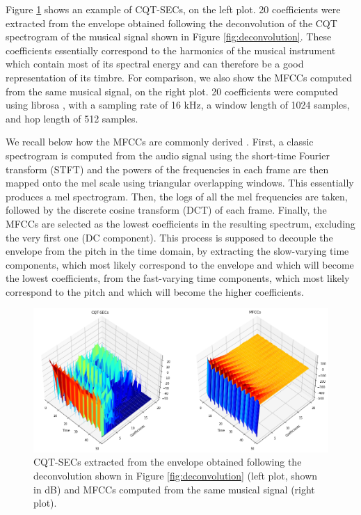 \documentclass[journal]{IEEEtran}
\begin{document}
Figure \ref{fig:extraction} shows an example of CQT-SECs, on the left plot. 20 coefficients were extracted from the envelope obtained following the deconvolution of the CQT spectrogram of the musical signal shown in Figure \ref{fig:deconvolution}. These coefficients essentially correspond to the harmonics of the musical instrument which contain most of its spectral energy and can therefore be a good representation of its timbre. For comparison, we also show the MFCCs computed from the same musical signal, on the right plot. 20 coefficients were computed using librosa \cite{mcfee2015}, with a sampling rate of 16 kHz, a window length of 1024 samples, and hop length of 512 samples. 

We recall below how the MFCCs are commonly derived \cite{mermelstein1976}. First, a classic spectrogram is computed from the audio signal using the short-time Fourier transform (STFT) and the powers of the frequencies in each frame are then mapped onto the mel scale \cite{stevens1937} using triangular overlapping windows. This essentially produces a mel spectrogram. Then, the logs of all the mel frequencies are taken, followed by the discrete cosine transform (DCT) of each frame. Finally, the MFCCs are selected as the lowest coefficients in the resulting spectrum, excluding the very first one (DC component). This process is supposed to decouple the envelope from the pitch in the time domain, by extracting the slow-varying time components, which most likely correspond to the envelope and which will become the lowest coefficients, from the fast-varying time components, which most likely correspond to the pitch and which will become the higher coefficients. 

\begin{figure}[htp]
    \centering
    \includegraphics[width=\textwidth]{extraction.png}
    \caption{CQT-SECs extracted from the envelope obtained following the deconvolution shown in Figure \ref{fig:deconvolution} (left plot, shown in dB) and MFCCs computed from the same musical signal (right plot).}
    \label{fig:extraction}
\end{figure}
\end{document}
